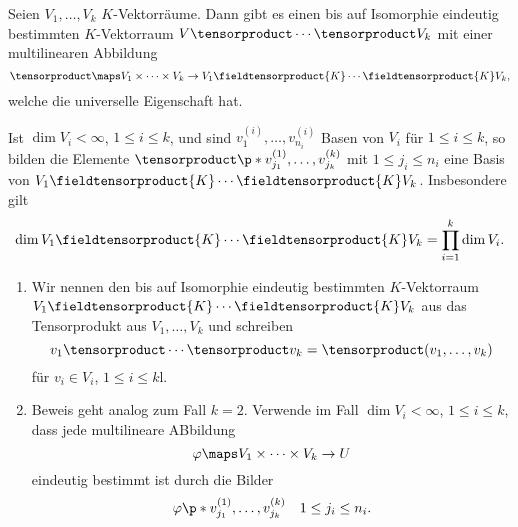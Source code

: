 \begin{satz}\label{mehrdimensionales_tensorprodukt}
  Seien \( V_1,\dotsc,V_k \) \( K\)-Vektorräume. Dann gibt es einen bis auf Isomorphie eindeutig bestimmten \( K \)-Vektorraum \( V\tensorproduct \dotsb \tensorproduct V_k \) mit einer multilinearen Abbildung
  \begin{equation*}
    \tensorproduct \maps V_1\times \dotsb \times V_k\to V_1\fieldtensorproduct{K} \dotsb \fieldtensorproduct{K}V_k,
  \end{equation*}
  welche die universelle Eigenschaft \tensorproperty hat.

  Ist \( \dim{V_i}<\infty \), \( 1\leq i\leq k \), und sind \( v_1^{(i)},\dotsc,v_{n_i}^{(i)} \) Basen von \( V_i \) für \( 1\leq i\leq k \), so bilden die Elemente \( \tensorproduct\p*{v_{j_1}^{(1)},\dotsc,v_{j_k}^{(k)}} \) mit \( 1\leq j_i\leq n_i \) eine Basis von \( V_1\fieldtensorproduct{K}\dotsb\fieldtensorproduct{K}V_k \). Insbesondere gilt
  \begin{equation*}
    \dim{V_1\fieldtensorproduct{K}\dotsb\fieldtensorproduct{K}V_k}=\prod_{i=1}^{k}\dim{V_i}.
  \end{equation*}
\end{satz}
\begin{bemerkungen*}
  \begin{enumerate}
    \item Wir nennen den bis auf Isomorphie eindeutig bestimmten \( K \)-Vektorraum \( V_1\fieldtensorproduct{K}\dotsb \fieldtensorproduct{K}V_k \) aus  das Tensorprodukt aus \( V_1,\dotsc,V_k \) und schreiben
    \begin{equation*}
      v_1\tensorproduct \dotsb\tensorproduct v_k=\tensorproduct(v_1,\dotsc,v_k)
    \end{equation*}
    für \( v_i\in V_i \), \( 1\leq i\leq k \)l.
    \item Beweis geht analog zum Fall \( k=2 \). Verwende im Fall \( \dim{V_i}<\infty \), \( 1\leq i\leq k \), dass jede multilineare ABbildung
    \begin{equation*}
      \varphi\maps V_1\times\dotsb\times V_k\to U
    \end{equation*}
    eindeutig bestimmt ist durch die Bilder
    \begin{equation*}
      \varphi\p*{v_{j_1}^{(1)},\dotsc,v_{j_k}^{(k)}}\quad 1\leq j_i\leq n_i.
    \end{equation*}
  \end{enumerate}
\end{bemerkungen*}
